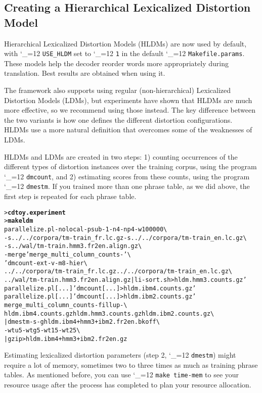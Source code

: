 \documentclass[11pt,letterpaper]{article}
\newcommand{\bs}{\textbackslash{}}
\def\code{\begingroup\catcode`\_=12 \codex}
\newcommand{\codex}[1]{\texttt{#1}\endgroup}
\begin{document}
\subsection{Creating a Hierarchical Lexicalized Distortion Model} \label{LDM}

Hierarchical Lexicalized Distortion Models (HLDMs) are now used by default,
with \code{USE_HLDM} set to \code{1} in the default \code{Makefile.params}.
These models help the decoder reorder words more appropriately during
translation. Best results are obtained when using it.

The framework also supports using regular (non-hierarchical) Lexicalized
Distortion Models (LDMs), but experiments have shown that HLDMs are much
more effective, so we recommend using those instead.  The key difference between
the two variants is how one defines the different distortion configurations.
HLDMs use a more natural definition that overcomes some of the weaknesses of
LDMs.

HLDMs and LDMs are created in two steps: 1) counting occurrences of the
different types of distortion instances over the training corpus, using the
program \code{dmcount}, and 2) estimating scores from these counts, using the
program \code{dmestm}.  If you trained more than one phrase table, as we did
above, the first step is repeated for each phrase table.
\begin{small}
\begin{alltt}
   > \textbf{cd toy.experiment}
   > \textbf{make ldm}
   parallelize.pl -nolocal -psub -1 -n 4 -np 4 -w 100000 \bs
      -s ../../corpora/tm-train_fr.lc.gz -s ../../corpora/tm-train_en.lc.gz \bs
      -s ../wal/tm-train.hmm3.fr2en.align.gz \bs
      -merge 'merge_multi_column_counts -' \bs
      'dmcount -ext -v -m 8 -hier \bs
         ../../corpora/tm-train_fr.lc.gz ../../corpora/tm-train_en.lc.gz \bs
         ../wal/tm-train.hmm3.fr2en.align.gz | li-sort.sh > hldm.hmm3.counts.gz'
   parallelize.pl [...] 'dmcount [...] > hldm.ibm4.counts.gz'
   parallelize.pl [...] 'dmcount [...] > hldm.ibm2.counts.gz'
   merge_multi_column_counts -fillup - \bs
      hldm.ibm4.counts.gz hldm.hmm3.counts.gz hldm.ibm2.counts.gz \bs
      | dmestm -s -g hldm.ibm4+hmm3+ibm2.fr2en.bkoff \bs
        -wtu 5 -wtg 5 -wt1 5 -wt2 5 \bs
      | gzip > hldm.ibm4+hmm3+ibm2.fr2en.gz
\end{alltt}
\end{small}

Estimating lexicalized distortion parameters (step 2, \code{dmestm}) might
require a lot of memory, sometimes two to three times as much as training
phrase tables.  As mentioned before, you can use \code{make time-mem} to see
your resource usage after the process has completed to plan your resource
allocation.
\end{document}
